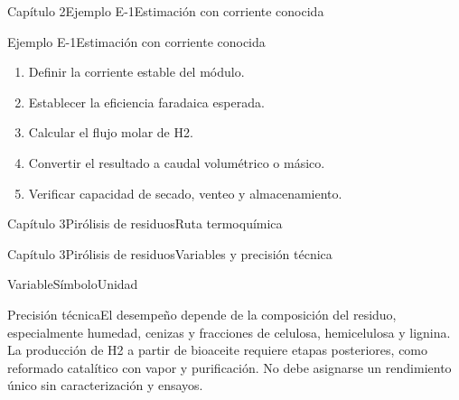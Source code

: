\documentclass{../plantilla/hvtbook}
\begin{document}
\begin{HVTPage}{Capítulo 2}{Ejemplo E-1}{Estimación con corriente conocida}
\begin{HVTExample}{Ejemplo E-1}{Estimación con corriente conocida}\begin{enumerate}\item Definir la corriente estable del módulo. \item Establecer la eficiencia faradaica esperada. \item Calcular el flujo molar de H2. \item Convertir el resultado a caudal volumétrico o másico. \item Verificar capacidad de secado, venteo y almacenamiento.\end{enumerate}\end{HVTExample}
\end{HVTPage}

\begin{HVTPage}{Capítulo 3}{Pirólisis de residuos}{Ruta termoquímica}
\begin{HVTFlow}\end{HVTFlow}
\end{HVTPage}

\begin{HVTPage}{Capítulo 3}{Pirólisis de residuos}{Variables y precisión técnica}
\begin{HVTTable}{Variable}{Símbolo}{Unidad}
\end{HVTTable}
\begin{HVTWarning}{Precisión técnica}El desempeño depende de la composición del residuo, especialmente humedad, cenizas y fracciones de celulosa, hemicelulosa y lignina.  La producción de H2 a partir de bioaceite requiere etapas posteriores, como reformado catalítico con vapor y purificación.  No debe asignarse un rendimiento único sin caracterización y ensayos.\end{HVTWarning}
\end{HVTPage}
\end{document}

